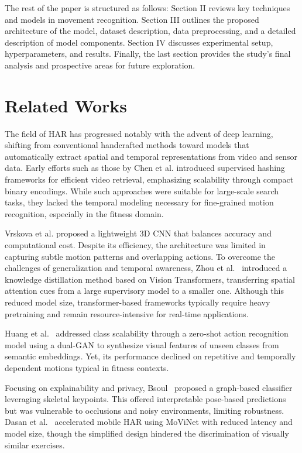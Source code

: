 \documentclass[conference]{IEEEtran}
\begin{document}
The rest of the paper is structured as follows: Section II reviews key techniques and models in movement recognition. Section III outlines the proposed architecture of the model, dataset description, data preprocessing, and a detailed description of model components. Section IV discusses experimental setup, hyperparameters, and results. Finally, the last section provides the study's final analysis and prospective areas for future exploration.

\section{Related Works}
The field of HAR has progressed notably with the advent of deep learning, shifting from conventional handcrafted methods toward models that automatically extract spatial and temporal representations from video and sensor data. Early efforts such as those by Chen et al. \cite{chen2021} introduced supervised hashing frameworks for efficient video retrieval, emphasizing scalability through compact binary encodings. While such approaches were suitable for large-scale search tasks, they lacked the temporal modeling necessary for fine-grained motion recognition, especially in the fitness domain.

Vrskova et al. \cite{vrskova2022} proposed a lightweight 3D CNN that balances accuracy and computational cost. Despite its efficiency, the architecture was limited in capturing subtle motion patterns and overlapping actions. To overcome the challenges of generalization and temporal awareness, Zhou et al.~\cite{zhou2022} introduced a knowledge distillation method based on Vision Transformers, transferring spatial attention cues from a large supervisory model to a smaller one. Although this reduced model size, transformer-based frameworks typically require heavy pretraining and remain resource-intensive for real-time applications.

Huang et al.~\cite{huang2023} addressed class scalability through a zero-shot action recognition model using a dual-GAN to synthesize visual features of unseen classes from semantic embeddings. Yet, its performance declined on repetitive and temporally dependent motions typical in fitness contexts.

Focusing on explainability and privacy, Bsoul~\cite{bsoul2025} proposed a graph-based classifier leveraging skeletal keypoints. This offered interpretable pose-based predictions but was vulnerable to occlusions and noisy environments, limiting robustness. Dasan et al.~\cite{dasan2025} accelerated mobile HAR using MoViNet with reduced latency and model size, though the simplified design hindered the discrimination of visually similar exercises.
\end{document}
